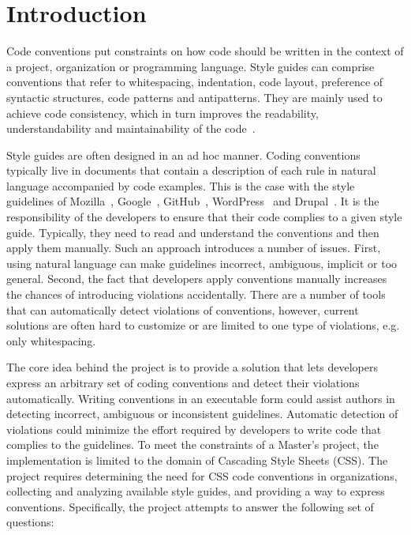 \chapter{Introduction}

Code conventions put constraints on how code should be written in the context
of a project, organization or programming language. Style guides can comprise
conventions that refer to whitespacing, indentation, code layout, preference
of syntactic structures, code patterns and antipatterns. They are mainly used
to achieve code consistency, which in turn improves the readability,
understandability and maintainability of the
code~\cite{Buse2010,tenny1988program,smit2011code}.

Style guides are often designed in an ad hoc manner. Coding conventions typically live in documents
that contain a description of each rule in natural language accompanied by code examples. This is
the case with the style guidelines of Mozilla~\cite{Mozilla}, Google~\cite{Google},
GitHub~\cite{GitHub}, WordPress~\cite{Wordpress} and Drupal~\cite{Drupal}. It is the responsibility
of the developers to ensure that their code complies to a given style guide. Typically, they need to
read and understand the conventions and then apply them manually. Such an approach introduces a
number of issues. First, using natural language can make guidelines incorrect, ambiguous, implicit
or too general. Second, the fact that developers apply conventions manually increases the chances of
introducing violations accidentally. There are a number of tools that can automatically detect
violations of conventions, however, current solutions are often hard to customize or are limited to
one type of violations, e.g. only whitespacing.

The core idea behind the project is to provide a solution that lets developers express an arbitrary
set of coding conventions and detect their violations automatically. Writing conventions
in an executable form could assist authors in detecting incorrect, ambiguous or inconsistent
guidelines. Automatic detection of violations could minimize the effort required by developers to
write code that complies to the guidelines. To meet the constraints of a Master’s project, the
implementation is limited to the domain of Cascading Style Sheets (CSS). The project requires
determining the need for CSS code conventions in organizations, collecting and analyzing available
style guides, and providing a way to express conventions. Specifically, the project attempts to
answer the following set of questions:

